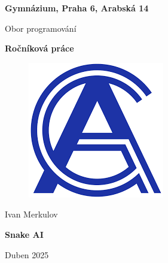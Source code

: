 \begin{titlepage}

\begin{center}

    {\LARGE \textbf{ Gymnázium, Praha 6, Arabská 14}}

    \vspace{0.5cm}

    {\Large Obor programování}

    \vspace{1cm}
    
    {\Huge \textbf{Ročníková práce}}

    \vspace{1cm}

    \begin{figure}[h]
        \centering
        \includegraphics[width=0.75\linewidth]{Images/Logo.png}
    \end{figure}

    \vspace{1cm}

    {\Large Ivan Merkulov}

    \vspace{1cm}
    
    {\Huge \textbf{Snake AI}}

    \vspace{2cm}
    
    {\Large Duben 2025}
    
\end{center}

\end{titlepage}
